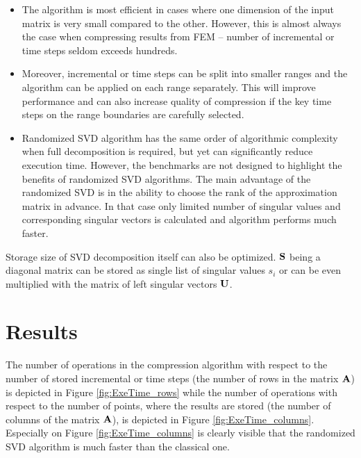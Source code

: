 \begin{itemize}
\item The algorithm is most efficient in cases where one dimension of the input matrix is very small compared to the other. However, this is almost always the case when compressing results from FEM -- number of incremental or time steps seldom exceeds hundreds.
\item Moreover, incremental or time steps can be split into smaller ranges and the algorithm can be applied on each range separately. This will improve performance and can also increase quality of compression if the key time steps on the range boundaries are carefully selected.
\item Randomized SVD algorithm has the same order of algorithmic complexity when full decomposition is required, but yet can significantly reduce execution time. However, the benchmarks are not designed to highlight the benefits of randomized SVD algorithms. The main advantage of the randomized SVD is in the ability to choose the rank of the approximation matrix in advance. In that case only limited number of singular values and corresponding singular vectors is calculated and algorithm performs much faster.
\end{itemize}

Storage size of SVD decomposition itself can also be optimized. $\mathbf{S}$ being a diagonal matrix can be stored as single list of singular values $s_{i}$ or can be even multiplied with the matrix of left singular vectors $\mathbf{U}$.



\section{Results}
\label{sec:results}

The number of operations in the compression algorithm with respect to the number of stored incremental or time steps (the number of rows in the matrix $\mathbf{A}$) is depicted in Figure \ref{fig:ExeTime_rows} while the number of operations with respect to the number of points, where the results are stored (the number of columns of the matrix $\mathbf{A}$), is depicted in Figure \ref{fig:ExeTime_columns}. Especially on Figure \ref{fig:ExeTime_columns} is clearly visible that the randomized SVD algorithm is much faster than the classical one.

